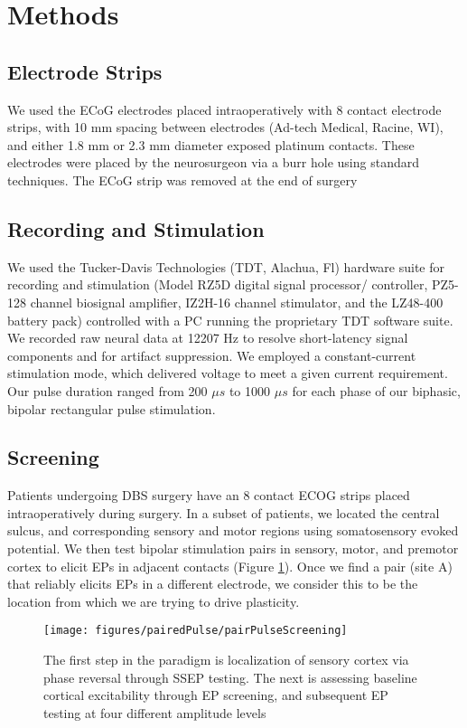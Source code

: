 \section{Methods}

\subsection{Electrode Strips}
We used the ECoG electrodes placed intraoperatively with 8 contact electrode strips, with 10 mm spacing between electrodes (Ad-tech Medical, Racine, WI), and either 1.8 mm or 2.3 mm diameter exposed platinum contacts. These electrodes were placed by the neurosurgeon via a burr hole using standard techniques. The ECoG strip was removed at the end of surgery

\subsection{Recording and Stimulation}
We used the Tucker-Davis Technologies (TDT, Alachua, Fl) hardware suite for recording and stimulation (Model RZ5D digital signal processor/ controller, PZ5-128 channel biosignal amplifier, IZ2H-16 channel stimulator, and the LZ48-400 battery pack) controlled with a PC running the proprietary TDT software suite.  We recorded raw neural data at 12207 Hz to resolve short-latency signal components and for artifact suppression. We employed a constant-current stimulation mode, which delivered voltage to meet a given current requirement. Our pulse duration ranged from 200 $\mu s$ to 1000 $\mu s$ for each phase of our biphasic, bipolar rectangular pulse stimulation. 

\subsection{Screening}

Patients undergoing DBS surgery have an 8 contact ECOG strips placed intraoperatively during surgery. In a subset of patients, we located the central sulcus, and corresponding sensory and motor regions using somatosensory evoked potential. We then test bipolar stimulation pairs in sensory, motor, and premotor cortex to elicit EPs in adjacent contacts (Figure \ref{fig:pairedPulseScreening}). Once we find a pair (site A) that reliably elicits EPs in a different electrode, we consider this to be the location from which we are trying to drive plasticity. 

\begin{figure}[ht]
	\centering
	\texttt{[image: figures/pairedPulse/pairPulseScreening]}
	\caption[Paired pulse screening protocol]{The first step in the paradigm is localization of sensory cortex via phase reversal through SSEP testing. The next is assessing baseline cortical excitability through EP screening, and subsequent EP testing at four different amplitude levels}
	\label{fig:pairedPulseScreening}
\end{figure}

